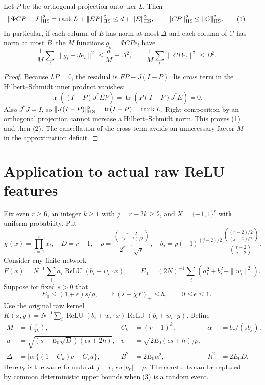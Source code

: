 \documentclass[11pt]{article}
\newcommand{\E}{\mathbb E}\newcommand{\R}{\mathbb R}
\newcommand{\relu}{\operatorname{ReLU}}
\begin{document}
\begin{lemma}
Let $P$ be the orthogonal projection onto $\ker L$. Then
\[
 \|\Phi CP-J\|_{\rm HS}^2
  =\operatorname{rank}L+\|EP\|_{\rm HS}^2
  \le d+\|E\|_{\rm HS}^2,
 \qquad
 \|CP\|_{\rm HS}^2\le\|C\|_{\rm HS}^2.
 \tag{1}
\]
In particular, if each column of $E$ has norm at most $\Delta$ and
each column of $C$ has norm at most $B$, the $M$ functions
$g_t=\Phi CP e_t$ have
\[
 \frac1M\sum_t\|g_t-Je_t\|^2\le\frac dM+\Delta^2,
 \qquad \frac1M\sum_t\|CPe_t\|^2\le B^2.
 \tag{2}
\]
\end{lemma}
\begin{proof}
Because $LP=0$, the residual is $EP-J(I-P)$.
Its cross term in the Hilbert--Schmidt inner product vanishes:
\[
 \operatorname{tr}((I-P)J^*EP)
   =\operatorname{tr}(P(I-P)J^*E)=0.
\]
Also $J^*J=I$, so $\|J(I-P)\|_{\rm HS}^2
=\operatorname{tr}(I-P)=\operatorname{rank}L$.
Right composition by an orthogonal projection cannot increase a
Hilbert--Schmidt norm. This proves (1) and then (2).
The cancellation of the cross term avoids an unnecessary factor $M$
in the approximation deficit.
\end{proof}

\section{Application to actual raw ReLU features}
Fix even $r\ge6$, an integer $k\ge1$ with $j=r-2k\ge2$, and
$X=\{-1,1\}^r$ with uniform probability. Put
\[
 \chi(x)=\prod_{l=1}^r x_l,\quad D=r+1,\quad
 \rho=\frac{\binom{r-2}{(r-2)/2}}{2^{r-1}\sqrt r},\quad
 b_j=\rho(-1)^{(j-2)/2}
 \frac{\binom{(r-2)/2}{(j-2)/2}}{\binom{r-2}{j-2}}.
\]
Consider any finite network
\[
 F(x)=N^{-1}\sum_i a_i\relu(b_i+w_i\cdot x),\qquad
 E_0=(2N)^{-1}\sum_i(a_i^2+b_i^2+\|w_i\|^2).
\]
Suppose for fixed $s>0$ that
\[
 E_0\le(1+\epsilon)s/\rho,\qquad
 \E(s-\chi F)_+\le h,\qquad 0\le\epsilon\le1.
 \tag{3}
\]
Use the original raw kernel
$K(x,y)=N^{-1}\sum_i\relu(b_i+w_i\cdot x)\relu(b_i+w_i\cdot y)$.
Define
\begin{align*}
 M&=\binom r{2k},&C_k&=(r-1)^k,&\alpha&=b_r/(s b_j),\\
 u&=\sqrt{(s+E_0\sqrt D)(\epsilon s+2h)},&
 v&=\sqrt{2E_0(\epsilon s+h)/\rho},\\
 \Delta&=|\alpha|\{(1+C_k)v+C_ku\},&
 B^2&=2E_0\alpha^2,&R^2&=2E_0D.
\end{align*}
Here $b_r$ is the same formula at $j=r$, so $|b_r|=\rho$.
The constants can be replaced by common deterministic upper bounds
when (3) is a random event.
\end{document}
